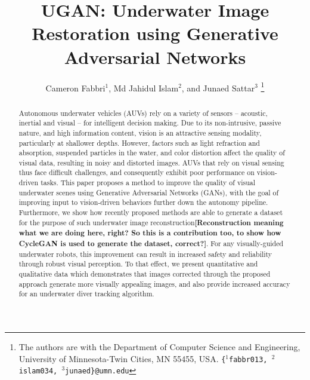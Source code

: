 \documentclass[letterpaper, 10pt, conference]{ieeeconf}
\title{UGAN: Underwater Image Restoration using Generative Adversarial Networks}
\author{Cameron Fabbri$^{1}$, Md Jahidul Islam$^{2}$, and Junaed Sattar$^{3}$
\thanks{				
  The authors are with the Department of Computer Science and Engineering, University of Minnesota-Twin  Cities, MN 55455, USA. \newline
 {\tt\small\{$^{1}$fabbr013, $^{2}$islam034, $^{3}$junaed\}@umn.edu} 
}
}
\newcommand{\marginlabel}[1]{\mbox{}\marginpar[\raggedleft\hspace{0pt}{#1}]{
\raggedright\hspace{0pt}{#1}}}
\newcommand{\starnote}[1]{\marginlabel{$\bigstar$}\textbf{[#1]}}
\begin{document}
\maketitle

\begin{abstract}
Autonomous underwater vehicles (AUVs) rely on a variety of sensors -- acoustic, inertial and visual -- for intelligent decision making. Due
to its non-intrusive, passive nature, and high information content, vision is an attractive sensing modality, particularly at shallower
depths. However, factors such as light refraction and absorption, suspended particles in the water, and color distortion affect the quality
of visual data, resulting in noisy and distorted images. AUVs that rely on visual sensing thus face difficult challenges, and consequently
exhibit poor performance on vision-driven tasks. This paper proposes a method to improve the quality of visual underwater scenes using
Generative Adversarial Networks (GANs), with the goal of improving input to vision-driven behaviors further down the autonomy
pipeline. Furthermore, we show how recently proposed methods are able to generate a dataset for the purpose of such underwater image
reconstruction\starnote{Reconstruction meaning what we are doing here, right? So this is a contribution too, to show how CycleGAN is used to
generate the dataset, correct?}. For any visually-guided underwater robots, this improvement can result in increased safety and reliability
through robust visual perception. To that effect, we present quantitative and qualitative data which demonstrates that images corrected
through the proposed approach generate more visually appealing images, and also provide increased accuracy for an underwater diver tracking
algorithm.
\end{abstract}

\end{document}
